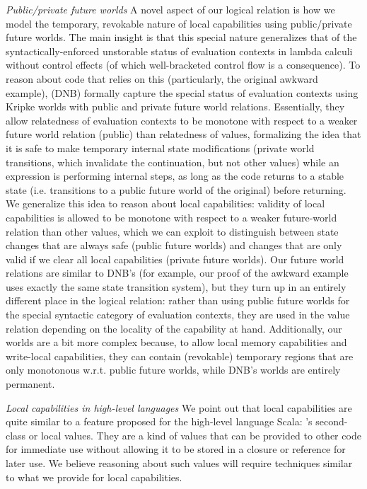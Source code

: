 \documentclass[compsoc,conference,letterpaper,fleqn]{IEEEtran}
\begin{document}
\emph{Public/private future worlds} A novel aspect of our logical relation is
how we model the temporary, revokable nature of local capabilities using public/private
future worlds. The main insight is that this special nature generalizes that of the syntactically-enforced
unstorable status of evaluation contexts in lambda calculi without control
effects (of which well-bracketed control flow is a consequence). To reason about
code that relies on this (particularly, the original awkward example),
\citet{Dreyer:jfp12} (DNB) formally capture the special status of evaluation
contexts using Kripke worlds with public and private future world relations.
Essentially, they allow relatedness of evaluation contexts to be monotone with
respect to a weaker future world relation (public) than relatedness of values,
formalizing the idea that it is safe to make temporary internal state
modifications (private world transitions, which invalidate the continuation,
but not other values) while an expression is performing internal steps, as long
as the code returns to a stable state (i.e. transitions to a public future world
of the original) before returning. We
generalize this idea to reason about local capabilities: validity of local
capabilities is allowed to be monotone with respect to a weaker future-world
relation than other values, which we can exploit to distinguish between state
changes that are always safe (public future worlds) and changes that are only
valid if we clear all local capabilities (private future worlds). Our future
world relations are similar to DNB's (for example, our proof of
the awkward example uses exactly the same state transition system),
but they turn up in an entirely different place in the logical relation: rather
than using public future worlds for the special syntactic category of evaluation
contexts, they are used in the value relation depending on the
locality of the capability at hand. Additionally, our worlds are a bit more
complex because, to allow local memory capabilities and write-local
capabilities, they can contain (revokable) temporary regions that are only
monotonous w.r.t. public future worlds, while DNB's worlds are entirely
permanent.

\emph{Local capabilities in high-level languages} We point out that
local capabilities are quite similar to a feature proposed for the high-level
language Scala: \citet{osvald_gentrification_2016}'s second-class or local
values. They are a kind of values that can be provided to other code for
immediate use without allowing it to be stored in a closure or reference for
later use. We believe reasoning about such values will require techniques similar 
to what we provide for local capabilities.
\end{document}
